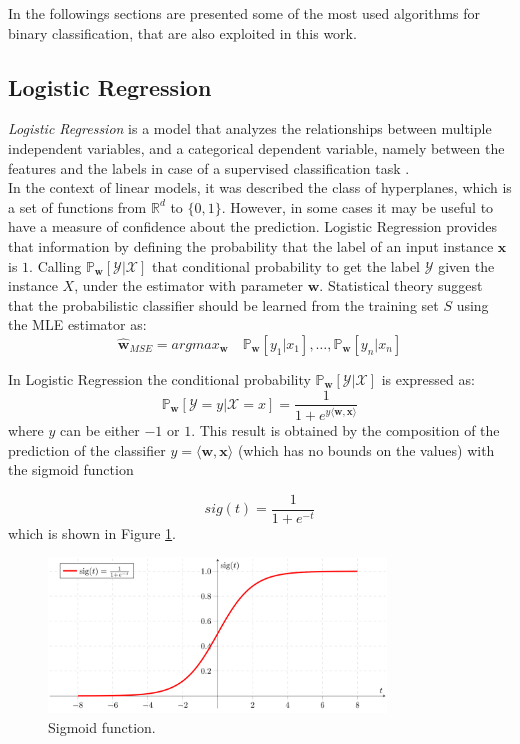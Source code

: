 In the followings sections are presented some of the most used algorithms for binary classification, that are also exploited in this work.


\subsection{Logistic Regression}

\textit{Logistic Regression} is a model that analyzes the relationships between multiple independent variables, and a categorical dependent variable, namely between the features and the labels in case of a supervised classification task \cite{article-logreg}.\\
In the context of linear models, it was described the class of hyperplanes, which is a set of functions from $\mathbb{R}^d$ to $\{0,1\}$. However, in some cases it may be useful to have a measure of confidence about the prediction. Logistic Regression provides that information by defining the probability that the label of an input instance $\mathbf{x}$ is $1$. Calling $\mathbb{P}_\mathbf{w}[\mathcal{Y} | \mathcal{X}]$ that conditional probability to get the label $\mathcal{Y}$ given the instance $X$, under the estimator with parameter $\mathbf{w}$. Statistical theory suggest that the probabilistic classifier should be learned from the training set $S$ using the MLE estimator as:
\[ \hat{\mathbf{w}}_{MSE} = argmax_\mathbf{w} \quad \mathbb{P}_\mathbf{w}[y_1 | x_1], \dots , \mathbb{P}_\mathbf{w}[y_n | x_n] \]

In Logistic Regression the conditional probability $\mathbb{P}_\mathbf{w}[\mathcal{Y} | \mathcal{X}]$ is expressed as:
\[ \mathbb{P}_\mathbf{w}[\mathcal{Y}=y | \mathcal{X}=x] = \frac{1}{1 + e^{y \langle \mathbf{w}, \mathbf{x} \rangle}} \]
where $y$ can be either $-1$ or $1$. This result is obtained by the composition of the prediction of the classifier $y = \langle \mathbf{w}, \mathbf{x} \rangle$ (which has no bounds on the values) with the sigmoid function

\[ sig(t) = \frac{1}{1 + e^{-t}} \]
which is shown in Figure \ref{fig:sigmoid}.

\begin{figure}[ht]
	\centering
	\includegraphics[width=0.8\textwidth]{figures/sigmoid.png}
	\caption{Sigmoid function.}
	\label{fig:sigmoid}
\end{figure}

